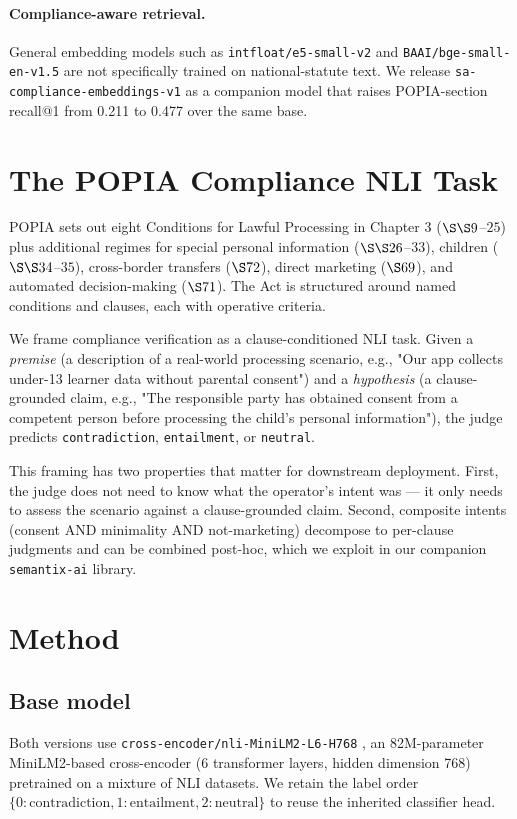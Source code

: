 \documentclass[11pt]{article}
\begin{document}
\paragraph{Compliance-aware retrieval.} General embedding models such as \texttt{intfloat/e5-small-v2} \cite{e5} and \texttt{BAAI/bge-small-en-v1.5} \cite{bge} are not specifically trained on national-statute text. We release \texttt{sa-compliance-embeddings-v1} as a companion model that raises POPIA-section recall@1 from 0.211 to 0.477 over the same base.

\section{The POPIA Compliance NLI Task}
\label{sec:task}

POPIA \cite{popia} sets out eight Conditions for Lawful Processing in Chapter 3 ($\S\S 9$--$25$) plus additional regimes for special personal information ($\S\S 26$--$33$), children ($\S\S 34$--$35$), cross-border transfers ($\S 72$), direct marketing ($\S 69$), and automated decision-making ($\S 71$). The Act is structured around named conditions and clauses, each with operative criteria.

We frame compliance verification as a clause-conditioned NLI task. Given a \emph{premise} (a description of a real-world processing scenario, e.g., "Our app collects under-13 learner data without parental consent") and a \emph{hypothesis} (a clause-grounded claim, e.g., "The responsible party has obtained consent from a competent person before processing the child's personal information"), the judge predicts \texttt{contradiction}, \texttt{entailment}, or \texttt{neutral}.

This framing has two properties that matter for downstream deployment. First, the judge does not need to know what the operator's intent was --- it only needs to assess the scenario against a clause-grounded claim. Second, composite intents (consent AND minimality AND not-marketing) decompose to per-clause judgments and can be combined post-hoc, which we exploit in our companion \texttt{semantix-ai} library.

\section{Method}
\label{sec:method}

\subsection{Base model}
Both versions use \texttt{cross-encoder/nli-MiniLM2-L6-H768} \cite{minilm-cross-encoder}, an 82M-parameter MiniLM2-based cross-encoder (6 transformer layers, hidden dimension 768) pretrained on a mixture of NLI datasets. We retain the label order $\{0: \mathrm{contradiction}, 1: \mathrm{entailment}, 2: \mathrm{neutral}\}$ to reuse the inherited classifier head.
\end{document}
